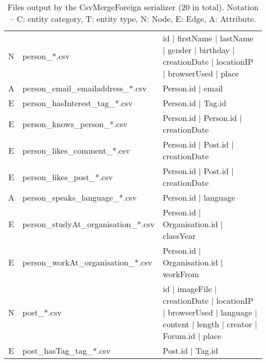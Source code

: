 \begin{table}[htb]
{\begin{tabular}{|c|p{4.3cm}|p{12.4cm}|}
        N                       & person\_*.csv                        & id | firstName | lastName | gender | birthday | creationDate | locationIP | browserUsed | place                     \\
        A                       & person\_email\_emailaddress\_*.csv   & Person.id | email                                                                                                   \\
        E                       & person\_hasInterest\_tag\_*.csv      & Person.id | Tag.id                                                                                                  \\
        E                       & person\_knows\_person\_*.csv         & Person.id | Person.id | creationDate                                                                                \\
        E                       & person\_likes\_comment\_*.csv        & Person.id | Post.id | creationDate                                                                                  \\
        E                       & person\_likes\_post\_*.csv           & Person.id | Post.id | creationDate                                                                                  \\
        A                       & person\_speaks\_language\_*.csv      & Person.id | language                                                                                                \\
        E                       & person\_studyAt\_organisation\_*.csv & Person.id | Organisation.id | classYear                                                                             \\
        E                       & person\_workAt\_organisation\_*.csv  & Person.id | Organisation.id | workFrom                                                                              \\
        \hline
        N                       & post\_*.csv                          & id | imageFile | creationDate | locationIP | browserUsed | language | content | length | creator | Forum.id | place \\
        E                       & post\_hasTag\_tag\_*.csv             & Post.id | Tag.id                                                                                                    \\
        \hline
    \end{tabular}}
    \caption{Files output by the CsvMergeForeign serializer (20 in total). Notation -- C: entity category, T: entity type, N: Node, E: Edge, A: Attribute.}
    \label{table:csv_merge_foreign}
\end{table}
